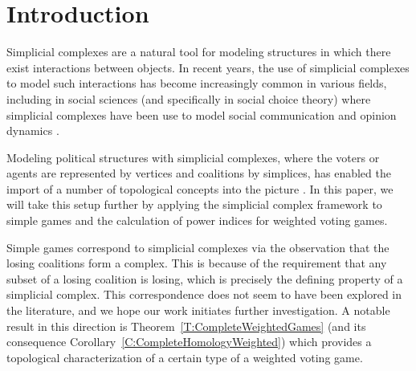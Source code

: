 \documentclass[11pt]{amsart}
\theoremstyle{plain}
\theoremstyle{definition}
\theoremstyle{remark}
\newcommand{\refT}[1]{Theorem~\ref{T:#1}}
\newcommand{\refC}[1]{Corollary~\ref{C:#1}}
\begin{document}
\tableofcontents



\parskip=5pt
\parindent=0cm








\section{Introduction}\label{S:Intro}
Simplicial complexes are a natural tool for modeling structures in which there exist interactions  between objects. In recent years, the use of simplicial complexes to model such interactions has become increasingly common in various fields, including in social sciences (and specifically in social choice theory) where simplicial complexes have been use to model social communication and opinion dynamics \cite{HG21, IPBL:SimplicialContagion, WZLS:SocialSimplicial}.

Modeling political structures with simplicial complexes, where the voters or agents are represented by vertices and coalitions by simplices, has enabled the import of a number of topological concepts into the picture \cite{AK:Conflict, MV:Politics}. In this paper, we will take this setup further by applying the simplicial complex framework to simple games and the calculation of power indices for weighted voting games.

Simple games correspond to simplicial complexes via the observation that the losing coalitions form a complex. This is because of the requirement that any subset of a losing coalition is losing, which is precisely the defining property of a simplicial complex. This correspondence does not seem to have been explored in the literature, and we hope our work initiates further investigation. A notable result in this direction is \refT{CompleteWeightedGames} (and its consequence \refC{CompleteHomologyWeighted}) which provides a topological characterization of a certain type of a weighted voting game.
\end{document}

